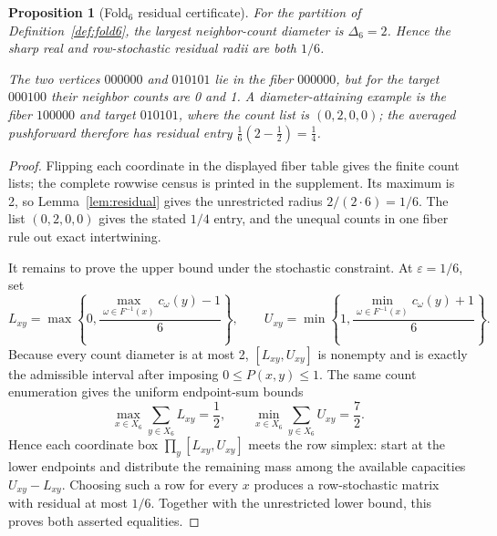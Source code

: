 \documentclass[12pt,a4paper]{article}
\theoremstyle{plain}
\newtheorem{proposition}[theorem]{Proposition}
\theoremstyle{definition}
\numberwithin{equation}{section}
\begin{document}
\begin{proposition}[Fold$_6$ residual certificate]\label{prop:residual-fold6}
For the partition of Definition~\ref{def:fold6}, the largest neighbor-count diameter is
\(\Delta_6=2\).  Hence the sharp real and row-stochastic residual radii are both
\(1/6\).

The two vertices \(000000\) and \(010101\) lie in the fiber \(000000\), but for
the target \(000100\) their neighbor counts are 0 and 1.  A diameter-attaining example
is the fiber \(100000\) and target \(010101\), where the count list is \((0,2,0,0)\);
the averaged pushforward therefore has residual entry \(\frac16(2-\frac12)=\frac14\).
\end{proposition}
\begin{proof}
Flipping each coordinate in the displayed fiber table gives the finite count lists; the
complete rowwise census is printed in the supplement.  Its maximum is 2, so
Lemma~\ref{lem:residual} gives the unrestricted radius \(2/(2\cdot6)=1/6\).  The list
\((0,2,0,0)\) gives the stated \(1/4\) entry, and the unequal counts in one fiber rule
out exact intertwining.

It remains to prove the upper bound under the stochastic constraint.  At
\(\varepsilon=1/6\), set
\[
L_{xy}=\max\left\{0,\frac{\max_{\omega\in F^{-1}(x)}c_\omega(y)-1}{6}\right\},
\qquad
U_{xy}=\min\left\{1,\frac{\min_{\omega\in F^{-1}(x)}c_\omega(y)+1}{6}\right\}.
\]
Because every count diameter is at most 2, \([L_{xy},U_{xy}]\) is nonempty and is
exactly the admissible interval after imposing \(0\le P(x,y)\le1\).  The same count
enumeration gives the uniform endpoint-sum bounds
\[
\max_{x\in X_6}\sum_{y\in X_6}L_{xy}=\frac12,
\qquad
\min_{x\in X_6}\sum_{y\in X_6}U_{xy}=\frac72.
\]
Hence each coordinate box \(\prod_y[L_{xy},U_{xy}]\) meets the row simplex: start at
the lower endpoints and distribute the remaining mass among the available capacities
\(U_{xy}-L_{xy}\).  Choosing such a row for every \(x\) produces a row-stochastic
matrix with residual at most \(1/6\).  Together with the unrestricted lower bound, this
proves both asserted equalities.
\end{proof}
\end{document}

